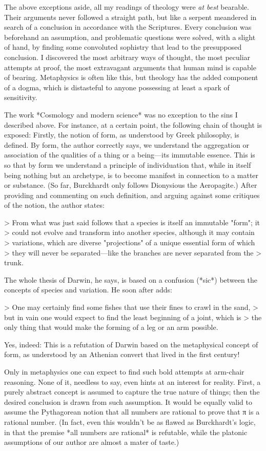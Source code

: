 \documentclass[a4paper, 12pt]{article}
\begin{document}
The above exceptions aside, all my readings of theology were \textit{at best}
bearable. Their arguments never followed a straight path, but like a serpent
meandered in search of a conclusion in accordance with the Scriptures. Every
conclusion was beforehand an assumption, and problematic questions were solved,
with a slight of hand, by finding some convoluted sophistry that lead to the
presupposed conclusion. I discovered the most arbitrary ways of thought, the
most peculiar attempts at proof, the most extravagant arguments that human mind
is capable of bearing. Metaphysics is often like this, but theology has the
added component of a dogma, which is distasteful to anyone possessing at least
a spark of sensitivity.

The work *Cosmology and modern science* was no exception to the sins I
described above. For instance, at a certain point, the following chain of
thought is exposed: Firstly, the notion of form, as understood by Greek
philosophy, is defined. By form, the author correctly says, we understand the
aggregation or association of the qualities of a thing or a being—its immutable
essence. This is so that by form we understand a principle of individuation
that, while in itself being nothing but an archetype, is to become manifest in
connection to a matter or substance. (So far, Burckhardt only follows
Dionysious the Aeropagite.) After providing and commenting on such definition,
and arguing against some critiques of the notion, the author states:

> From what was just said follows that a species is itself an immutable "form"; it
> could not evolve and transform into another species, although it may contain
> variations, which are diverse "projections" of a unique essential form of which
> they will never be separated—like the branches are never separated from the
> trunk.

The whole thesis of Darwin, he says, is based on a confusion (*sic*) between the
concepts of species and variation. He soon after adds:

> One may certainly find some fishes that use their fines to crawl in the sand,
> but in vain one would expect to find the least beginning of a joint, which is
> the only thing that would make the forming of a leg or an arm possible.

Yes, indeed: This is a refutation of Darwin based on the metaphysical concept
of form, as understood by an Athenian convert that lived in the first century!

Only in metaphysics one can expect to find such bold attempts at arm-chair
reasoning. None of it, needless to say, even hints at an interest for reality.
First, a purely abstract concept is assumed to capture the true nature of
things; then the desired conclusion is drawn from such assumption. It would be
equally valid to assume the Pythagorean notion that all numbers are rational to
prove that π is a rational number. (In fact, even this wouldn't be as flawed as
Burckhardt's logic, in that the premise *all numbers are rational* is
refutable, while the platonic assumptions of our author are almost a mater of
taste.) 
\end{document}
